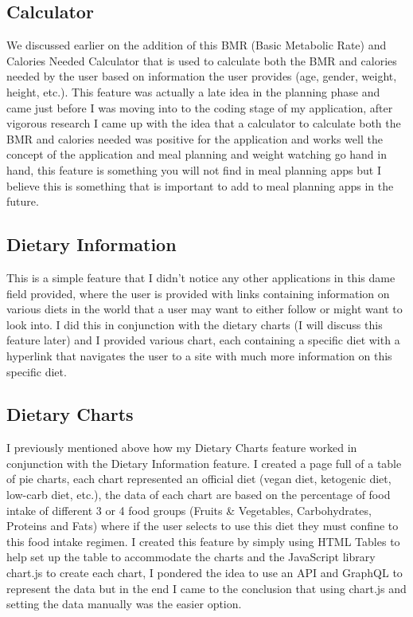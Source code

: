 \subsection{Calculator}

We discussed earlier on the addition of this BMR (Basic Metabolic Rate) and Calories Needed Calculator that is used to calculate both the BMR and calories needed by the user based on information the user provides (age, gender, weight, height, etc.). This feature was actually a late idea in the planning phase and came just before I was moving into to the coding stage of my application, after vigorous research I came up with the idea that a calculator to calculate both the BMR and calories needed was positive for the application and works well the concept of the application and meal planning and weight watching go hand in hand, this feature is something you will not find in meal planning apps but I believe this is something that is important to add to meal planning apps in the future.

\subsection{Dietary Information}

This is a simple feature that I didn't notice any other applications in this dame field provided, where the user is provided with links containing information on various diets in the world that a user may want to either follow or might want to look into. I did this in conjunction with the dietary charts (I will discuss this feature later) and I provided various chart, each containing a specific diet with a hyperlink that navigates the user to a site with much more information on this specific diet.

\subsection{Dietary Charts}

I previously mentioned above how my Dietary Charts feature worked in conjunction with the Dietary Information feature. I created a page full of a table of pie charts, each chart represented an official diet (vegan diet, ketogenic diet, low-carb diet, etc.), the data of each chart are based on the percentage of food intake of different 3 or 4 food groups (Fruits \& Vegetables, Carbohydrates, Proteins and Fats) where if the user selects to use this diet they must confine to this food intake regimen. I created this feature by simply using HTML Tables to help set up the table to accommodate the charts and the JavaScript library chart.js to create each chart, I pondered the idea to use an API and GraphQL to represent the data but in the end I came to the conclusion that using chart.js and setting the data manually was the easier option.

